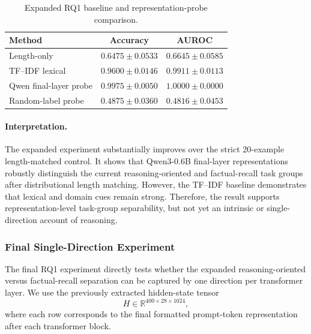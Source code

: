 \documentclass[11pt]{article}
\begin{document}
\begin{table}[H]
    \centering
    \begin{tabular}{lcc}
        \toprule
        Method & Accuracy & AUROC \\
        \midrule
        Length-only & \(0.6475 \pm 0.0533\) & \(0.6645 \pm 0.0585\) \\
        TF--IDF lexical & \(0.9600 \pm 0.0146\) & \(0.9911 \pm 0.0113\) \\
        Qwen final-layer probe & \(0.9975 \pm 0.0050\) & \(1.0000 \pm 0.0000\) \\
        Random-label probe & \(0.4875 \pm 0.0360\) & \(0.4816 \pm 0.0453\) \\
        \bottomrule
    \end{tabular}
    \caption{Expanded RQ1 baseline and representation-probe comparison.}
    \label{tab:expanded-baseline-summary}
\end{table}

\paragraph{Interpretation.}

The expanded experiment substantially improves over the strict
20-example length-matched control. It shows that Qwen3-0.6B
final-layer representations robustly distinguish the current
reasoning-oriented and factual-recall task groups after distributional
length matching. However, the TF--IDF baseline demonstrates that
lexical and domain cues remain strong. Therefore, the result supports
representation-level task-group separability, but not yet an intrinsic
or single-direction account of reasoning.



\subsubsection{Final Single-Direction Experiment}

The final RQ1 experiment directly tests whether the expanded reasoning-oriented versus factual-recall separation can be captured by one direction per transformer layer. We use the previously extracted hidden-state tensor
\[
H \in \mathbb{R}^{400 \times 28 \times 1024},
\]
where each row corresponds to the final formatted prompt-token representation after each transformer block.
\end{document}
